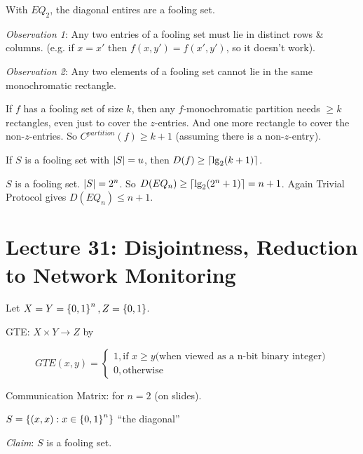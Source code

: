 \begin{example}
    With $EQ_2$, the diagonal entires are a fooling set.

    \emph{Observation 1}: Any two entries of a fooling set must lie in distinct rows \& columns. (e.g. if $x = x'$ then $f(x, y') = f(x', y')$, so it doesn't work).

    \emph{Observation 2}: Any two elements of a fooling set cannot lie in the same monochromatic rectangle.
\end{example}

\begin{corollary}
    If $f$ has a fooling set of size $k$, then any $f$-monochromatic partition needs $\geq k$ rectangles, even just to cover the $z$-entries. And one more rectangle to cover the non-$z$-entries. So $C^{partition}(f) \geq k + 1$ (assuming there is a non-$z$-entry).
\end{corollary}

\begin{corollary}
    If $S$ is a fooling set with $\left | S \right | = u$, then $D(f) \geq \left \lceil \lg_2(k + 1) \right \rceil$.
\end{corollary}

$S$ is a fooling set. $\left | S \right | = 2^n$. So $D(EQ_n) \geq \left \lceil \lg_2(2^n + 1) \right \rceil = n + 1$. Again Trivial Protocol gives $D(EQ_n) \leq n + 1$.

\section*{Lecture 31: Disjointness, Reduction to Network Monitoring}

Let $X = Y = \left \{ 0, 1 \right \}^n, Z = \left \{ 0, 1 \right \}$.

\begin{definition}
    GTE: $X \times Y \rightarrow Z$ by

    \begin{dmath*}
        GTE(x, y) = \begin{cases}
            1, \text{if } x \geq y \text{(when viewed as a n-bit binary integer)} \\
            0, \text{otherwise}
        \end{cases}
    \end{dmath*}
\end{definition}

Communication Matrix: for $n = 2$ (on slides).

$S = \left \{ (x, x): x \in \left \{ 0, 1 \right \}^n \right \}$ ``the diagonal''

\emph{Claim}: $S$ is a fooling set.


